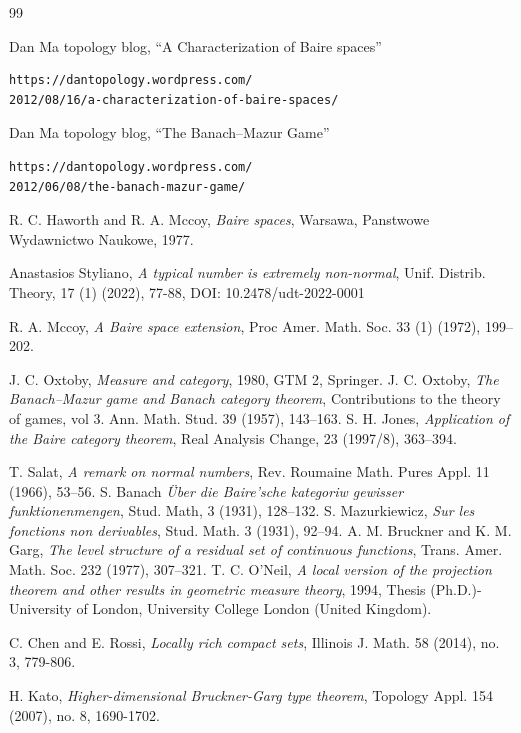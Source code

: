 \documentclass[leqno, 12pt]{jsarticle}
\begin{document}
	
\begin{thebibliography}{99}

Dan Ma topology blog, 
``A Characterization of Baire spaces''
\begin{verbatim}
https://dantopology.wordpress.com/
2012/08/16/a-characterization-of-baire-spaces/
\end{verbatim}

Dan Ma topology blog, 
``The Banach--Mazur Game''
\begin{verbatim}
https://dantopology.wordpress.com/
2012/06/08/the-banach-mazur-game/
\end{verbatim}
R. C. Haworth and R. A. Mccoy, 
\textit{Baire spaces}, 
Warsawa, Panstwowe Wydawnictwo Naukowe, 1977. 

Anastasios Styliano, 
\textit{A typical number is extremely non-normal}, 
Unif. Distrib. Theory, 
17 (1)
(2022), 
77-88, 
DOI: 10.2478/udt-2022-0001

R. A. Mccoy, 
\textit{A Baire space extension}, 
Proc Amer. Math. Soc. 
33 (1) (1972), 
199--202. 

J. C. 
Oxtoby, \textit{Measure and category}, 
1980, 
GTM 2, Springer. 
\cite{ox2}
J. C. Oxtoby, 
\textit{The Banach--Mazur game and Banach category 
theorem}, 
Contributions to the theory of games, 
vol 3.  Ann. Math. Stud. 39 (1957), 
143--163. 
S. H. Jones, 
\textit{Application of the Baire category theorem}, 
Real Analysis Change, 23 (1997/8), 363--394. 

T. Salat, 
\textit{A remark on normal numbers}, 
Rev. Roumaine Math. Pures Appl. 11 (1966), 53--56. 
S. Banach 
\textit{\"{U}ber die Baire'sche kategoriw gewisser funktionenmengen}, 
Stud. Math, 
3 (1931), 128--132.
S. Mazurkiewicz, 
\textit{Sur les fonctions non derivables}, 
 Stud. Math. 3 (1931), 
92--94. 
A. M. Bruckner and K. M. Garg, 
\textit{The level structure of a residual set of continuous functions}, 
Trans. Amer. Math. Soc. 232 (1977), 307--321. 
T. C. O'Neil, 
\textit{A local version of the projection theorem and other results in geometric measure theory}, 
1994, Thesis (Ph.D.)-University of London, University College London (United Kingdom).

C. Chen and E. Rossi, 
\textit{Locally rich compact sets}, 
Illinois J. Math. 58 (2014), no. 3, 779-806.

H. Kato, 
\textit{Higher-dimensional Bruckner-Garg type theorem}, Topology Appl. 154 (2007), no. 8, 1690-1702.
\end{thebibliography}




			
\end{document}

